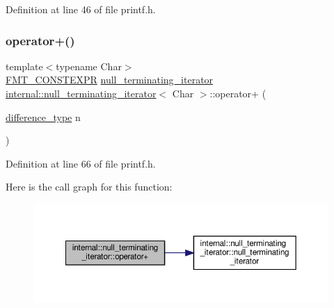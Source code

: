 Definition at line 46 of file printf.\+h.

\mbox{\label{classinternal_1_1null__terminating__iterator_aeae6584db999a36a796367a78492554e}} 
\subsubsection{\texorpdfstring{operator+()}{operator+()}}
{\footnotesize\ttfamily template$<$typename Char$>$ \\
\hyperlink{core_8h_a69201cb276383873487bf68b4ef8b4cd}{F\+M\+T\+\_\+\+C\+O\+N\+S\+T\+E\+X\+PR} \hyperlink{classinternal_1_1null__terminating__iterator}{null\+\_\+terminating\+\_\+iterator} \hyperlink{classinternal_1_1null__terminating__iterator}{internal\+::null\+\_\+terminating\+\_\+iterator}$<$ Char $>$\+::operator+ (\begin{DoxyParamCaption}\item[{\hyperlink{classinternal_1_1null__terminating__iterator_ad1a2aa728f679bdfdbdc644f1c43e819}{difference\+\_\+type}}]{n }\end{DoxyParamCaption})\hspace{0.3cm}{\ttfamily [inline]}}



Definition at line 66 of file printf.\+h.

Here is the call graph for this function\+:
\nopagebreak
\begin{figure}[H]
\begin{center}
\leavevmode
\includegraphics[width=350pt]{classinternal_1_1null__terminating__iterator_aeae6584db999a36a796367a78492554e_cgraph}
\end{center}
\end{figure}
\mbox{\label{classinternal_1_1null__terminating__iterator_aa191ed6b74135576631425612bdfe258}} 
